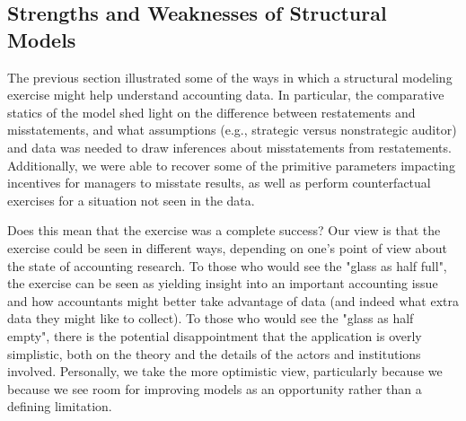 \subsection{Strengths and Weaknesses of Structural Models}

The previous section illustrated some of the ways in which a structural modeling exercise might help understand
accounting data. In particular, the comparative statics of the model shed light on the difference between restatements
and misstatements, and what assumptions (e.g., strategic versus nonstrategic auditor) and data was needed to draw 
inferences about misstatements from restatements. Additionally, we were able to recover some of the primitive parameters
impacting incentives for managers to misstate results, as well as perform counterfactual exercises for a situation not
seen in the data.

Does this mean that the exercise was a complete success? Our view is that the exercise could be seen
in different ways, depending on one's point of view about the state of accounting research. To those
who would see the  "glass as half full", the exercise can be seen as yielding insight into an important
accounting issue and how accountants might better take advantage of data (and indeed what extra
data they might like to collect). To those who would see the  "glass as half empty", there is the potential
disappointment that the application is overly simplistic, both on the theory and the details of the
actors and institutions involved. Personally, we take the more optimistic view, particularly because we
because we see room for improving models as an opportunity rather than a defining limitation.